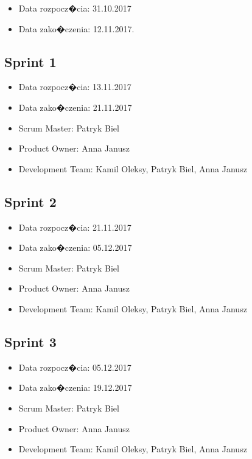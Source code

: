 ﻿\documentclass[a4paper]{article}
\begin{document}
\begin{itemize}
\item Data rozpocz�cia: 31.10.2017
\item  Data zako�czenia: 12.11.2017.
\end{itemize}

\subsection{Sprint 1}

\begin{itemize}
\item Data rozpocz�cia:  13.11.2017
\item Data zako�czenia: 21.11.2017
\item Scrum Master: Patryk Biel
\item Product Owner: Anna Janusz
\item Development Team: Kamil Oleksy, Patryk Biel, Anna Janusz
\end{itemize}

\subsection{Sprint 2}

\begin{itemize}
\item Data rozpocz�cia: 21.11.2017
\item  Data zako�czenia: 05.12.2017
\item Scrum Master: Patryk Biel
\item Product Owner: Anna Janusz
\item Development Team: Kamil Oleksy, Patryk Biel, Anna Janusz
\end{itemize}

\subsection{Sprint 3}

\begin{itemize}
\item Data rozpocz�cia: 05.12.2017
\item  Data zako�czenia: 19.12.2017
\item Scrum Master: Patryk Biel
\item Product Owner: Anna Janusz
\item Development Team: Kamil Oleksy, Patryk Biel, Anna Janusz
\end{itemize}
\end{document}

